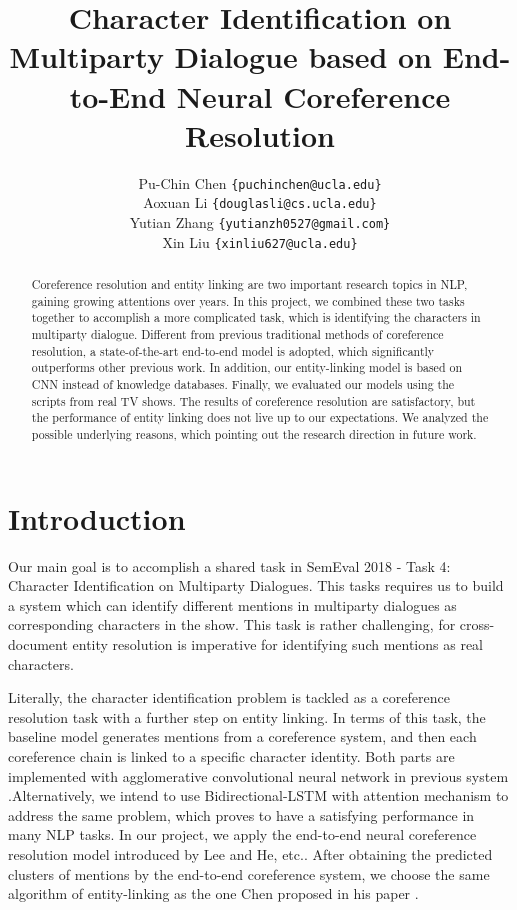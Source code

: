 \documentclass[11pt]{article}
\title{Character Identification on Multiparty Dialogue based on End-to-End Neural Coreference Resolution}
\author
{
   Pu-Chin Chen
  {\tt \{puchinchen@ucla.edu\}} \\
  Aoxuan Li 
  {\tt \{douglasli@cs.ucla.edu\}} \\
  Yutian Zhang
  {\tt \{yutianzh0527@gmail.com\}} \\
  Xin Liu
  {\tt \{xinliu627@ucla.edu\}} \\
}
\date{}
\begin{document}
\maketitle
\begin{abstract}
  Coreference resolution and entity linking are two important research topics in NLP, gaining growing attentions over years. In this project, we combined these two tasks together to accomplish a more complicated task, which is identifying the characters in multiparty dialogue. Different from previous traditional methods of coreference resolution, a state-of-the-art end-to-end model is adopted, which significantly outperforms other previous work. In addition, our entity-linking model is based on CNN instead of knowledge databases. Finally, we evaluated our models using the scripts from real TV shows. The results of coreference resolution are satisfactory, but the performance of entity linking does not live up to our expectations. We analyzed the possible underlying reasons, which pointing out the research direction in future work.
\end{abstract}

\section{Introduction}

Our main goal is to accomplish a shared task in SemEval 2018 - Task 4: Character Identification on Multiparty Dialogues. This tasks requires us to build a system which can identify different mentions in multiparty dialogues as corresponding characters in the show. This task is rather challenging, for cross-document entity resolution is imperative for identifying such mentions as real characters.

Literally, the character identification problem is tackled as a coreference resolution task with a further step on entity linking. In terms of this task, the baseline model generates mentions from a coreference system, and then each coreference chain is linked to a specific character identity. Both parts are implemented with agglomerative convolutional neural network in previous system \cite{Robust,Character}.Alternatively, we intend to use Bidirectional-LSTM with attention mechanism to address the same problem, which proves to have a satisfying performance in many NLP tasks. In our project, we apply the end-to-end neural coreference resolution model introduced by Lee and He, etc.\cite{2017arXiv170707045L}. After obtaining the predicted clusters of mentions by the end-to-end coreference system, we choose the same algorithm of entity-linking as the one Chen proposed in his paper \cite{Robust}.
\end{document}

